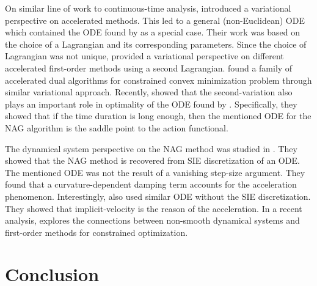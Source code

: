 \documentclass{article}
\theoremstyle{plain}
\theoremstyle{definition}
\theoremstyle{remark}
\begin{document}
On similar line of work to continuous-time analysis, \cite{WibisonoE7351} introduced a variational perspective on accelerated methods. This led to a general (non-Euclidean) ODE which contained the ODE found by \cite{JMLR:v17:15-084} as a special case. Their work was based on the choice of a Lagrangian and its corresponding parameters. Since the choice of Lagrangian was not unique, \cite{wilson2021lyapunov} provided a variational perspective on different accelerated first-order methods using a second Lagrangian. \cite{7963773} found a family of accelerated dual algorithms for constrained convex minimization problem through similar variational approach. Recently, \cite{zhang2021rethinking} showed that the second-variation also plays an important role in optimality of the ODE found by \cite{JMLR:v17:15-084}. Specifically, they showed that if the time duration is long enough, then the mentioned ODE for the NAG algorithm is the saddle point to the action functional. \par
The dynamical system perspective on the NAG method was studied in \cite{muehlebach2019dynamical}. They showed that the NAG method is recovered from SIE discretization of an ODE. The mentioned ODE was not the result of a vanishing step-size argument. They found that a curvature-dependent damping term accounts for the acceleration phenomenon. Interestingly, \cite{chen2022gradient} also used similar ODE without the SIE discretization. They showed that implicit-velocity is the reason of the acceleration. In a recent analysis, \cite{muehlebach2023accelerated} explores the connections between non-smooth dynamical systems and first-order methods for constrained optimization.

\section{Conclusion}\label{sec_conclusion}
\end{document}
